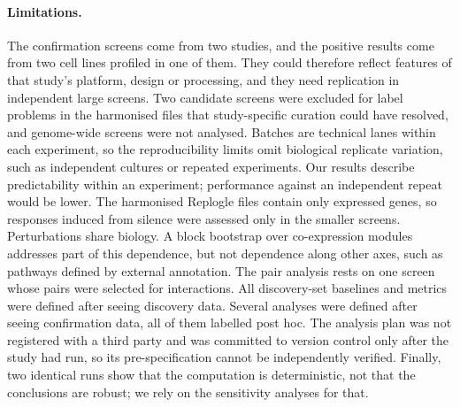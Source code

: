 \paragraph{Limitations.} The confirmation screens come from two studies, and the positive results come from two cell lines profiled in one of them. They could therefore reflect features of that study's platform, design or processing, and they need replication in independent large screens. Two candidate screens were excluded for label problems in the harmonised files that study-specific curation could have resolved, and genome-wide screens were not analysed. Batches are technical lanes within each experiment, so the reproducibility limits omit biological replicate variation, such as independent cultures or repeated experiments. Our results describe predictability within an experiment; performance against an independent repeat would be lower. The harmonised Replogle files contain only expressed genes, so responses induced from silence were assessed only in the smaller screens. Perturbations share biology. A block bootstrap over co-expression modules addresses part of this dependence, but not dependence along other axes, such as pathways defined by external annotation. The pair analysis rests on one screen whose pairs were selected for interactions. All discovery-set baselines and metrics were defined after seeing discovery data. Several analyses were defined after seeing confirmation data, all of them labelled post hoc. The analysis plan was not registered with a third party and was committed to version control only after the study had run, so its pre-specification cannot be independently verified. Finally, two identical runs show that the computation is deterministic, not that the conclusions are robust; we rely on the sensitivity analyses for that.
